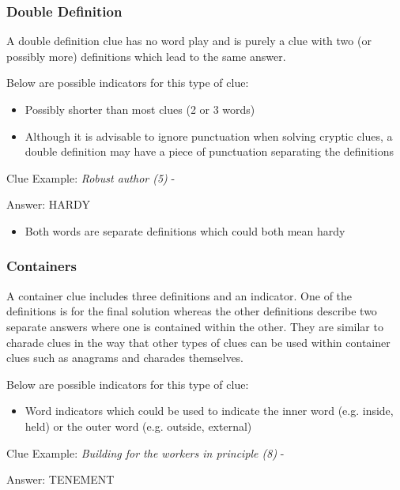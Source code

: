 \subsubsection{Double Definition}

A double definition clue has no word play and is purely a clue with two (or possibly more) definitions which lead to the same answer. 

Below are possible indicators for this type of clue:
\begin{itemize} 
	\item Possibly shorter than most clues (2 or 3 words) 
	\item Although it is advisable to ignore punctuation when solving cryptic clues, a double definition may have a piece of punctuation separating the definitions 
\\
\end{itemize}

Clue Example: \emph{Robust author (5)}  - \citep{shuchiDouble08}

Answer: HARDY 

\begin{itemize}
	\item Both words are separate definitions which could both mean hardy 
\end{itemize}

\subsubsection{Containers}

A container clue includes three definitions and an indicator. One of the definitions is for the final solution whereas the other definitions describe two separate answers where one is contained within the other. They are similar to charade clues in the way that other types of clues can be used within container clues such as anagrams and charades themselves.  

Below are possible indicators for this type of clue:
\begin{itemize} 
	\item Word indicators which could be used to indicate the inner word (e.g. inside, held) or the outer word (e.g. outside, external)
\\
\end{itemize}

Clue Example: \emph{Building for the workers in principle (8)}  - \citep{shuchiContainers09}

Answer: TENEMENT 

